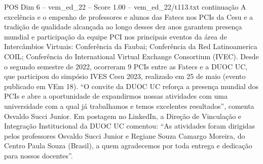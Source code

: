 \begin{textsample}{POS Dim 6 – vem\_ed\_22 – Score 1.00 – vem\_ed\_22/t113.txt}  \label{ex:f6_pos_048}
continuação A excelência e o empenho de professores e alunos das Fatecs nos PCIs da Cesu e a tradição de qualidade alcançada ao longo desses dez anos garantem presença mundial e participação da equipe PCI nos principais eventos da área de Intercâmbios Virtuais: Conferência da Faubai; Conferência da Red Latinoamerica COIL; Conferência do International Virtual Exchange Consortium (IVEC).
Desde o segundo semestre de 2022, ocorreram 9 PCIs entre as Fatecs e a DUOC UC, que participou do simpósio IVES Cesu 2023, realizado em 25 de maio (evento publicado em VEm 18). “O convite da DUOC UC reforça a presença mundial dos PCIs e abre a oportunidade de expandirmos nossas atividades com uma universidade com a qual já trabalhamos e temos excelentes resultados”, comenta Osvaldo Succi Junior.
Em postagem no LinkedIn, a Direção de Vinculação e Integração Institucional da DUOC UC comentou: “As atividades foram dirigidas pelos professores Osvaldo Succi Junior e Regiane Souza Camargo Moreira, do Centro Paula Souza (Brasil), a quem agradecemos por toda entrega e dedicação para nossos docentes”.

\end{textsample}
